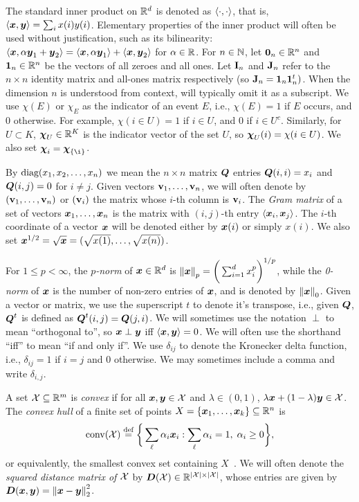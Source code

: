 The standard inner product on $\mathbb{R}^d$ is denoted as $\langle\cdot,\cdot\rangle$, that is, $\langle \vb*{x},\vb*{y}\rangle = \sum_i x(i)y(i)$. Elementary properties of the inner product will often be used without justification, such as its bilinearity: $\langle \vb*{x},\alpha\vb*{y}_1+\vb*{y}_2\rangle  = \langle \vb*{x},\alpha\vb*{y}_1\rangle + \langle \vb*{x},\vb*{y}_2\rangle$ for $\alpha\in\mathbb{R}$. 
For $n\in \mathbb{N}$, let $\vb{0}_n\in\mathbb{R}^n$ and $\vb{1}_n\in\mathbb{R}^n$ be the vectors of all zeroes and all ones. Let $\vb{I}_n$ and $\vb{J}_n$  refer to the $n\times n$ identity matrix and all-ones matrix respectively (so $\vb{J}_n=\vb{1}_n\vb{1}_n^t)$. When the dimension $n$ is understood from context, will typically omit it as a subscript. We use $\chi(E)$ or $\chi_E$ as the indicator of an event $E$, i.e., $\chi(E)=1$ if $E$ occurs, and 0 otherwise. For example, $\chi(i\in U)=1$ if $i\in U$, and 0 if $i\in U^c$.  Similarly, for $U\subset K$,  $\boldsymbol{\chi}_U\in\mathbb{R}^K$ is the indicator vector of the set $U$, so $\boldsymbol{\chi}_U(i)=\chi(i\in U)$. We  also set $\bchi_i=\bchi_{\{\i\}}$.


By $\text{diag}(x_1,x_2,\dots,x_n)$ we mean the $n\times n$ matrix $\vb*{Q}$ entries $\vb*{Q}(i,i)=x_i$ and $\vb*{Q}(i,j)=0$ for $i\neq j$. Given vectors $\vb{v}_1,\dots,\vb{v}_n$, we will often denote by $(\vb{v}_1,\dots,\vb{v}_n)$  or  $(\vb{v}_i)$ the matrix whose $i$-th column is $\vb{v}_i$. 
The  \emph{Gram matrix} of a set  of vectors $\vb*{x}_1,\dots,\vb*{x}_n$ is the matrix with $(i,j)$-th entry $\langle \vb*{x}_i,\vb*{x}_j\rangle$. 
The $i$-th coordinate of a vector $\vb*{x}$ will be denoted either by $\vb*{x}(i)$ or simply $x(i)$. We  also set $\vb*{x}^{1/2}=\sqrt{\vb*{x}}=(\sqrt{x(1)},\dots,\sqrt{x(n)})$. 

 For $1\leq p<\infty$, the \emph{$p$-norm} of $\vb*{x}\in \mathbb{R}^d$ is 
$\norm{\vb*{x}}_p = \bigg(\sum_{i=1}^d x_i^p\bigg)^{1/p}$,
while the \emph{0-norm} of $\vb*{x}$ is the number of non-zero entries of $\vb*{x}$, and is denoted by $\norm{\vb*{x}}_0$.  Given a vector or matrix, we use the superscript $t$ to denote it's transpose, i.e., given $\vb*{Q}$, $\vb*{Q}^t$ is defined as $\vb*{Q}^t(i,j) = \vb*{Q}(j,i)$.  We will sometimes use the notation $\perp$ to mean ``orthogonal to'', so $\vb*{x}\perp\vb*{y}$ iff $\langle\vb*{x},\vb*{y}\rangle=0$. We will often use the shorthand ``iff'' to mean ``if and only if''. We use $\delta_{ij}$ to denote the Kronecker delta function, i.e., $\delta_{ij} = 1$ if $i=j$ and 0 otherwise. We may sometimes include a comma and write $\delta_{i,j}$. 

A set $\mathcal{X}\subseteq\mathbb{R}^m$ is \emph{convex} if for all $\vb*{x},\vb*{y}\in\mathcal{X}$ and $\lambda\in(0,1)$, $\lambda\vb*{x} + (1-\lambda)\vb*{y}\in \mathcal{X}$. 
The \emph{convex hull} of a finite set of points $X=\{\vb*{x}_1,\dots,\vb*{x}_k\}\subseteq \mathbb{R}^n$ is 
\begin{equation}
\label{eq:conv(X)}
\textnormal{conv}(\mathcal{X}) \overset{\text{def}}{=} \bigg\{\sum_\ell \alpha_i\vb*{x}_i: \sum_\ell \alpha_i = 1, \;\alpha_i\geq 0\bigg\},
\end{equation}
or equivalently, the smallest convex set containing $X$~\cite{grunbaum1967convex}. We will often denote the \emph{squared distance matrix of $\mathcal{X}$} by $\vb*{D}(\mathcal{X})\in\mathbb{R}^{|\mathcal{X}|\times |\mathcal{X}|}$,  whose entries are given by $\vb*{D}(\vb*{x},\vb*{y}) = \norm{\vb*{x}-\vb*{y}}_2^2$.  


